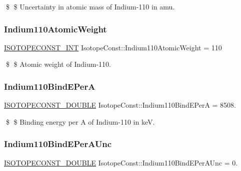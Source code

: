 \$ \$ Uncertainty in atomic mass of Indium-\/110 in amu. \mbox{\label{group___isotope_const-_indium-_in110_gabcf9bf4e6c944aa9c7cfcc2087b8ff17}} 
\subsubsection{\texorpdfstring{Indium110\+Atomic\+Weight}{Indium110AtomicWeight}}
{\footnotesize\ttfamily \mbox{\hyperlink{group___isotope_const-_macros_ga5f18360b3e99483a35c32d789e62621c}{I\+S\+O\+T\+O\+P\+E\+C\+O\+N\+S\+T\+\_\+\+I\+NT}} Isotope\+Const\+::\+Indium110\+Atomic\+Weight = 110}

\$ \$ Atomic weight of Indium-\/110. \mbox{\label{group___isotope_const-_indium-_in110_gaad3d37debd4572a3138aab8de75f6091}} 
\subsubsection{\texorpdfstring{Indium110\+Bind\+E\+PerA}{Indium110BindEPerA}}
{\footnotesize\ttfamily \mbox{\hyperlink{group___isotope_const-_macros_ga8f45a7272ce02c0b4c65c44636ed719a}{I\+S\+O\+T\+O\+P\+E\+C\+O\+N\+S\+T\+\_\+\+D\+O\+U\+B\+LE}} Isotope\+Const\+::\+Indium110\+Bind\+E\+PerA = 8508.}

\$ \$ Binding energy per A of Indium-\/110 in keV. \mbox{\label{group___isotope_const-_indium-_in110_ga646fa556bfedbd7e9172bb55d90fdb8a}} 
\subsubsection{\texorpdfstring{Indium110\+Bind\+E\+Per\+A\+Unc}{Indium110BindEPerAUnc}}
{\footnotesize\ttfamily \mbox{\hyperlink{group___isotope_const-_macros_ga8f45a7272ce02c0b4c65c44636ed719a}{I\+S\+O\+T\+O\+P\+E\+C\+O\+N\+S\+T\+\_\+\+D\+O\+U\+B\+LE}} Isotope\+Const\+::\+Indium110\+Bind\+E\+Per\+A\+Unc = 0.}

